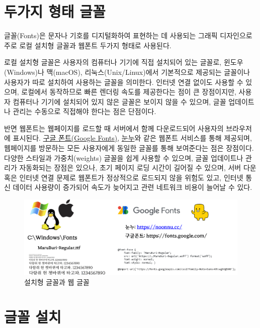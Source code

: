 \documentclass[
  letterpaper,
]{book}
\begin{document}
\hypertarget{uxb450uxac00uxc9c0-uxd615uxd0dc-uxae00uxaf34}{%
\section{두가지 형태
글꼴}\label{uxb450uxac00uxc9c0-uxd615uxd0dc-uxae00uxaf34}}

글꼴(Fonts)은 문자나 기호를 디지털화하여 표현하는 데 사용되는 그래픽
디자인으로 주로 로컬 설치형 글꼴과 웹폰트 두가지 형태로 사용된다.

로컬 설치형 글꼴은 사용자의 컴퓨터나 기기에 직접 설치되어 있는 글꼴로,
윈도우(Windows)나 맥(macOS), 리눅스(Unix/Linux)에서 기본적으로 제공되는
글꼴이나 사용자가 따로 설치하여 사용하는 글꼴을 의미한다. 인터넷 연결
없이도 사용할 수 있으며, 로컬에서 동작하므로 빠른 렌더링 속도를
제공한다는 점이 큰 장점이지만, 사용자 컴퓨터나 기기에 설치되어 있지 않은
글꼴은 보이지 않을 수 있으며, 글꼴 업데이트나 관리는 수동으로 직접해야
한다는 점은 단점이다.

반면 웹폰트는 웹페이지를 로드할 때 서버에서 함께 다운로드되어 사용자의
브라우저에 표시된다. \href{https://fonts.google.com/}{구글 폰트(Google
Fonts)}, \href{https://noonnu.cc/}{눈누}와 같은 웹폰트 서비스를 통해
제공되며, 웹페이지를 방문하는 모든 사용자에게 동일한 글꼴를 통해
보여준다는 점은 장점이다. 다양한 스타일과 가중치(weights) 글꼴을 쉽게
사용할 수 있으며, 글꼴 업데이트나 관리가 자동화되는 장점은 있으나, 초기
페이지 로딩 시간이 길어질 수 있으며, 서버 다운 혹은 인터넷 연결 문제로
웹폰트가 정상적으로 로드되지 않을 위험도 있고, 인터넷 통신 데이터
사용량이 증가되어 속도가 늦어지고 관련 네트워크 비용이 늘어날 수 있다.

\begin{figure}

{\centering \includegraphics{images/ttf-web-fonts.png}

}

\caption{설치형 글꼴과 웹 글꼴}

\end{figure}

\hypertarget{uxae00uxaf34-uxc124uxce58}{%
\section{글꼴 설치}\label{uxae00uxaf34-uxc124uxce58}}
\end{document}
